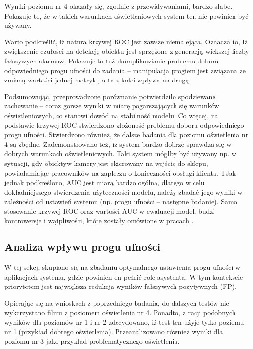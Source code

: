 Wyniki poziomu nr 4 okazały się, zgodnie z przewidywaniami, bardzo słabe. Pokazuje to, że w takich warunkach oświetleniowych system ten nie powinien być używany.

Warto podkreślić, iż natura krzywej ROC jest zawsze niemalejąca. Oznacza to, iż zwiększenie czułości na detekcję obiektu jest sprzężone z generacją wiekszej liczby fałszywych alarmów.
Pokazuje to też skomplikowianie problemu doboru odpowiedniego progu ufności do zadania -- manipulacja progiem jest związana ze zmianą wartości jednej metryki, a ta z kolei wpływa na drugą.

Podsumowując, przeprowadzone porównanie potwierdziło spodziewane zachowanie -- coraz gorsze wyniki w miarę pogarszających się warunków oświetleniowych, co stanowi dowód na stabilność modelu. 
Co więcej, na podstawie krzywej ROC stwierdzono złożoność problemu doboru odpowiedniego progu ufności. 
Stwierdzono również, że dalsze badania dla poziomu oświetlenia nr 4 są zbędne. 
Zademonstrowano też, iż system bardzo dobrze sprawdza się w dobrych warunkach oświetleniowych. 
Taki system mógłby być używany np. w sytuacji, gdy obiektyw kamery jest skierowany na wejście do sklepu, powiadamiając pracowników na zapleczu o konieczności obsługi klienta. 
TJak jednak podkreślono, AUC jest miarą bardzo ogólną, dlatego w celu dokładniejszego stwierdzenia użyteczności modelu, należy zbadać jego wyniki w zależności od ustawień systemu (np. progu ufności -- następne badanie). Samo stosowanie krzywej ROC oraz wartości AUC w ewaluacji modeli budzi kontrowersje i wątpliwości, które zostały omówione w pracach \cite{AUC_critique1,AUC_critique2}.






\subsection{Analiza wpływu progu ufności}
W tej sekcji skupiono się na zbadaniu optymalnego ustawienia progu ufności w aplikacjach systemu, gdzie powinien on pełnić role asystenta. W tym kontekście priorytetem jest największa redukcja wyników fałszywych pozytywnych (FP). 

Opierając się na wnioskach z poprzedniego badania, do dalszych testów nie wykorzystano filmu z poziomem oświetlenia nr 4. 
Ponadto, z racji podobnych wyników dla poziomów nr 1 i nr 2 zdecydowano, iż test ten użyje tylko poziomu nr 1 (przykład dobrego oświetlenia). Przeanalizowano również wyniki dla poziomu nr 3 jako przykład problematycznego oświetlenia. 

